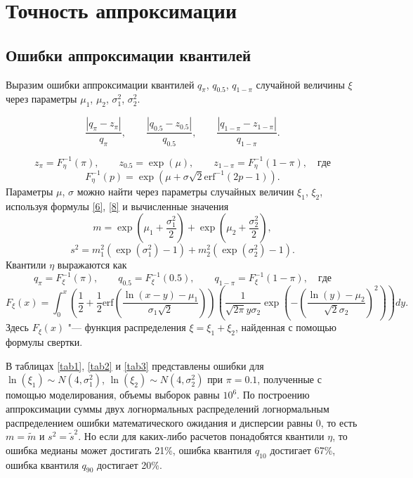 \documentclass[specialist, substylefile = spbu.rtx,
subf,href,colorlinks=true, 12pt]{disser}
\begin{document}
\section{Точность аппроксимации}
\subsection{Ошибки аппроксимации квантилей}

Выразим ошибки аппроксимации квантилей $q_{\pi}$, $q_{0.5}$, $q_{1-\pi}$ случайной величины $\xi$ через параметры $\mu_{1}$, $\mu_{2}$, $\sigma_{1}^{2}$, $\sigma_{2}^{2}$.

\[\dfrac{\left| q_{\pi} - z_{\pi}\right|}{q_{\pi}}, \quad\quad \dfrac{\left| q_{0.5} - z_{0.5}\right|}{q_{0.5}}, \quad\quad \dfrac{\left| q_{1-\pi} - z_{1-\pi}\right|}{q_{1-\pi}}.\]

\[z_{\pi} = F_{\eta}^{-1}(\pi), \quad\quad z_{0.5} = \exp(\mu), \quad\quad z_{1-\pi} = F_{\eta}^{-1}(1-\pi), \quad где\]
\[F_{\eta}^{-1}(p) = \exp(\mu+\sigma\sqrt{2}\mathrm{erf}^{-1}(2p-1)).\]
Параметры $\mu$, $\sigma$ можно найти через параметры случайных величин $\xi_{1}$, $\xi_{2}$, используя формулы \eqref{6}, \eqref{8} и вычисленные значения
\[m = \exp\left( \mu_{1}+\frac{\sigma_{1}^{2}}{2}\right) + \exp\left( \mu_{2}+\frac{\sigma_{2} ^{2}}{2}\right),\]
\[s^{2} = m_{1}^{2}(\exp(\sigma_{1}^{2})-1)+m_{2}^{2}(\exp(\sigma_{2}^{2})-1).\]
Квантили $\eta$ выражаются как
\[q_{\pi} = F_{\xi}^{-1}(\pi), \quad\quad q_{0.5} = F_{\xi}^{-1}(0.5), \quad\quad q_{1-\pi} = F_{\xi}^{-1}(1-\pi), \quad где\]
\[F_{\xi}(x) = \int_{0}^{x}\left( \dfrac{1}{2}+\dfrac{1}{2} \mathrm{erf}\left( \dfrac{\ln(x-y)-\mu_{1}}{\sigma_{1}\sqrt{2}}\right) \right) \left( \dfrac{1}{\sqrt{2\pi}y\sigma_{2}}\exp\left( -\left( \dfrac{\ln(y)-\mu_{2}}{\sqrt{2}\sigma_{2}}\right) ^{2}\right) \right) dy. \]
Здесь $F_{\xi}(x)$ "--- функция распределения $\xi = \xi_{1}+\xi_{2}$, найденная с помощью формулы свертки.

В таблицах \ref{tab1}, \ref{tab2} и \ref{tab3} представлены ошибки для $\ln(\xi_{1}) \sim N(4, \sigma _{1}^{2})$, $\ln(\xi_{2}) \sim N(4, \sigma_{2}^{2})$ при $\pi=0.1$, полученные с помощью моделирования, объемы выборок равны $10^{6}$. По построению аппроксимации суммы двух логнормальных распределений логнормальным распределением ошибки математического ожидания и дисперсии равны 0, то есть $m=\tilde{m}$ и $s^{2} = \tilde{s}^{2}$. Но если для каких-либо расчетов понадобятся квантили $\eta$, то ошибка медианы может достигать 21\%, ошибка  квантиля $q_{10}$ достигает 67\%, ошибка квантиля $q_{90}$ достигает 20\%.
\end{document}
